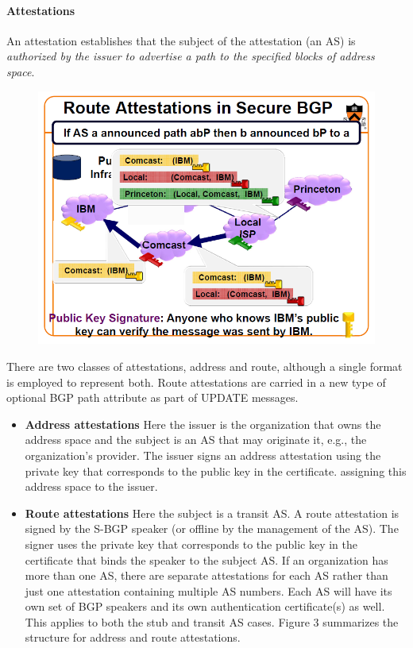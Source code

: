 \documentclass[12pt]{article}
\begin{document}
\paragraph*{Attestations}
An attestation establishes that the subject of the attestation (an
AS) is \textit{authorized by the issuer to advertise a path to the specified blocks of address space}.
\begin{figure}[h!]
  \centering
  \includegraphics[scale = 0.6]{S-BGP.png}
 \end{figure}

There are two classes of attestations, address and route, although a single format is employed
to represent both. Route attestations are carried in a new type of
optional BGP path attribute as part of UPDATE messages.
\begin{itemize}
\item
\textbf{Address attestations} Here the issuer is the organization
that owns the address space and the subject is an AS that
may originate it, e.g., the organization's provider. The issuer signs an address attestation using the private key that
corresponds to the public key in the certificate.
assigning this address space to the issuer.
\item \textbf{Route attestations} Here the subject is a transit AS. A route
attestation is signed by the S-BGP speaker (or offline by
the management of the AS). The signer uses the private
key that corresponds to the public key in the certificate
that binds the speaker to the subject AS.
If an organization has more than one AS, there are separate attestations for each AS rather than just one attestation containing
multiple AS numbers. Each AS will have its own set of BGP
speakers and its own authentication certificate(s) as well. This
applies to both the stub and transit AS cases. Figure 3 summarizes the structure for address and route attestations.
\end{itemize}
\end{document}

